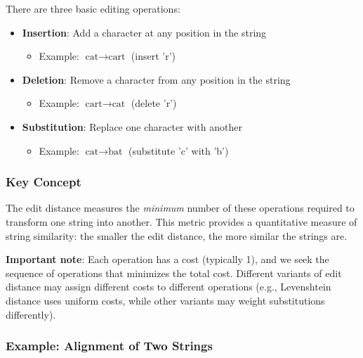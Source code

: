 \documentclass[11pt,a4paper]{article}
\theoremstyle{definition}
\theoremstyle{plain}
\theoremstyle{remark}
\begin{document}
\begin{tcolorbox}[colback=blue!5!white,colframe=blue!75!black,title=\textbf{Three Basic Edit Operations}]
There are three basic editing operations:
\begin{itemize}
    \item \textbf{Insertion}: Add a character at any position in the string
    \begin{itemize}
        \item Example: $\text{cat} \rightarrow \text{cart}$ (insert 'r')
    \end{itemize}
    
    \item \textbf{Deletion}: Remove a character from any position in the string
    \begin{itemize}
        \item Example: $\text{cart} \rightarrow \text{cat}$ (delete 'r')
    \end{itemize}
    
    \item \textbf{Substitution}: Replace one character with another
    \begin{itemize}
        \item Example: $\text{cat} \rightarrow \text{bat}$ (substitute 'c' with 'b')
    \end{itemize}
\end{itemize}
\end{tcolorbox}

\subsubsection{Key Concept}
The edit distance measures the \textit{minimum} number of these operations required to transform one string into another. This metric provides a quantitative measure of string similarity: the smaller the edit distance, the more similar the strings are.

\textbf{Important note}: Each operation has a cost (typically 1), and we seek the sequence of operations that minimizes the total cost. Different variants of edit distance may assign different costs to different operations (e.g., Levenshtein distance uses uniform costs, while other variants may weight substitutions differently).

\subsubsection{Example: Alignment of Two Strings}
\end{document}
